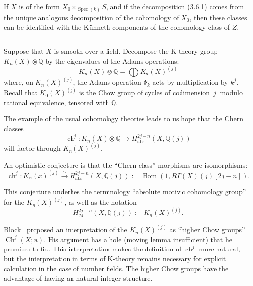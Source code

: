 \documentclass{article}
\theoremstyle{plain}
\theoremstyle{definition}
\newcommand{\scr}[1]{{\mathscr{#1}}}
\newcommand{\QQ}{\mathbb{Q}}
\newcommand{\abs}{\mathrm{abs}}
\DeclareMathOperator{\Hom}{Hom}
\DeclareMathOperator{\Spec}{Spec}
\DeclareMathOperator{\ch}{ch}
\DeclareMathOperator{\Ch}{Ch}
\newcommand{\oldpage}[1]{\marginpar{\footnotesize$\Big\vert$ \textit{p.~#1}}}
\begin{document}
If $X$ is of the form $X_0\times_{\Spec(k)}S$, and if the decomposition \hyperref[3.6.1]{(3.6.1)} comes from the unique analogous decomposition of the cohomology of $X_0$, then these classes can be identified with the K\"{u}nneth components of the cohomology class of $Z$.


\subsection{}
\label{3.7}

Suppose that $X$ is smooth over a field.
Decompose the K-theory group $K_n(X)\otimes\QQ$ by the eigenvalues of the Adams operations:
\[
  K_n(X)\otimes\QQ = \bigoplus K_n(X)^{(j)}
\]
where, on $K_n(X)^{(j)}$, the Adams operation $\Psi_k$ acts by multiplication by $k^j$.
Recall that $K_0(X)^{(j)}$ is the Chow group of cycles of codimension~$j$, modulo rational equivalence, tensored with $\QQ$.

The example of the usual cohomology theories leads to us hope that the Chern classes
\[
  \ch^j\colon K_n(X)\otimes\QQ \to H_\abs^{2j-n}(X,\QQ(j))
\]
will factor through $K_n(X)^{(j)}$.

An optimistic conjecture is that the ``Chern class'' morphisms are isomorphisms:
\[
\label{3.7.1}
  \ch^j\colon K_n(x)^{(j)} \xrightarrow{\sim} H_\abs^{2j-n}(X,\QQ(j)) := \Hom(1,R\Gamma(X)(j)[2j-n]).
\tag{3.7.1}
\]

\oldpage{158}
This conjecture underlies the terminology ``absolute motivic cohomology group'' for the $K_n(X)^{(j)}$, as well as the notation
\[
  H_\scr{M}^{2j-n}(X,\QQ(j)) := K_n(X)^{(j)}.
\]

Block~\cite{4} proposed an interpretation of the $K_n(X)^{(j)}$ as ``higher Chow groups'' $\Ch^j(X;n)$.
His argument has a hole (moving lemma insufficient) that he promises to fix.
This interpretation makes the definition of $\ch^j$ more natural, but the interpretation in terms of K-theory remains necessary for explicit calculation in the case of number fields.
The higher Chow groups have the advantage of having an natural integer structure.


\subsection{}
\label{3.8}
\end{document}
